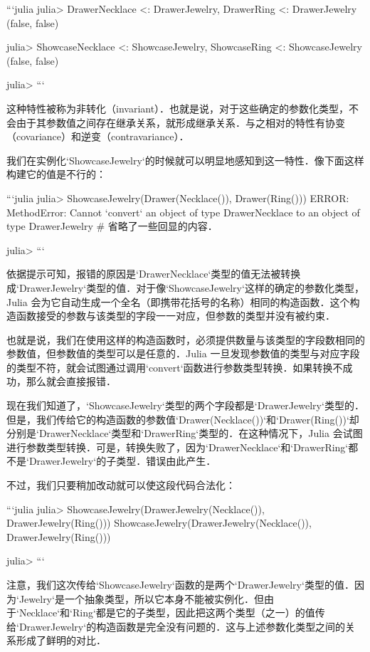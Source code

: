 ```julia
julia> Drawer{Necklace} <: Drawer{Jewelry}, Drawer{Ring} <: Drawer{Jewelry}
(false, false)

julia> Showcase{Necklace} <: Showcase{Jewelry}, Showcase{Ring} <: Showcase{Jewelry}
(false, false)

julia> 
```

这种特性被称为非转化（invariant）．也就是说，对于这些确定的参数化类型，不会由于其参数值之间存在继承关系，就形成继承关系．与之相对的特性有协变（covariance）和逆变（contravariance）．

我们在实例化`Showcase{Jewelry}`的时候就可以明显地感知到这一特性．像下面这样构建它的值是不行的：

```julia
julia> Showcase{Jewelry}(Drawer(Necklace()), Drawer(Ring()))
ERROR: MethodError: Cannot `convert` an object of type Drawer{Necklace} to an object of type Drawer{Jewelry}
# 省略了一些回显的内容．

julia> 
```

依据提示可知，报错的原因是`Drawer{Necklace}`类型的值无法被转换成`Drawer{Jewelry}`类型的值．对于像`Showcase{Jewelry}`这样的确定的参数化类型，Julia 会为它自动生成一个全名（即携带花括号的名称）相同的构造函数．这个构造函数接受的参数与该类型的字段一一对应，但参数的类型并没有被约束．

也就是说，我们在使用这样的构造函数时，必须提供数量与该类型的字段数相同的参数值，但参数值的类型可以是任意的．Julia 一旦发现参数值的类型与对应字段的类型不符，就会试图通过调用`convert`函数进行参数类型转换．如果转换不成功，那么就会直接报错．

现在我们知道了，`Showcase{Jewelry}`类型的两个字段都是`Drawer{Jewelry}`类型的．但是，我们传给它的构造函数的参数值`Drawer(Necklace())`和`Drawer(Ring())`却分别是`Drawer{Necklace}`类型和`Drawer{Ring}`类型的．在这种情况下，Julia 会试图进行参数类型转换．可是，转换失败了，因为`Drawer{Necklace}`和`Drawer{Ring}`都不是`Drawer{Jewelry}`的子类型．错误由此产生．

不过，我们只要稍加改动就可以使这段代码合法化：

```julia
julia> Showcase{Jewelry}(Drawer{Jewelry}(Necklace()), Drawer{Jewelry}(Ring()))
Showcase{Jewelry}(Drawer{Jewelry}(Necklace()), Drawer{Jewelry}(Ring()))

julia> 
```

注意，我们这次传给`Showcase{Jewelry}`函数的是两个`Drawer{Jewelry}`类型的值．因为`Jewelry`是一个抽象类型，所以它本身不能被实例化．但由于`Necklace`和`Ring`都是它的子类型，因此把这两个类型（之一）的值传给`Drawer{Jewelry}`的构造函数是完全没有问题的．这与上述参数化类型之间的关系形成了鲜明的对比．

